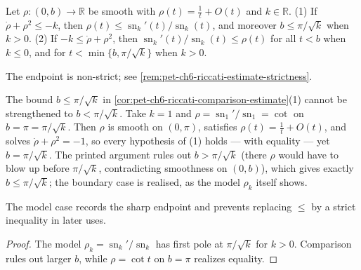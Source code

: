 \begin{corollary}
  \label{cor:pet-ch6-riccati-comparison-estimate}


  Let $\rho:(0,b)\to\mathbb{R}$ be smooth with $\rho(t)=\tfrac1t+O(t)$ and $k\in\mathbb{R}$.
  (1) If $\dot\rho+\rho^2\le-k$, then $\rho(t)\le\operatorname{sn}_k'(t)/\operatorname{sn}_k(t)$, and
  moreover $b\le\pi/\sqrt k$ when $k>0$. (2) If $-k\le\dot\rho+\rho^2$, then
  $\operatorname{sn}_k'(t)/\operatorname{sn}_k(t)\le\rho(t)$ for all $t<b$ when $k\le0$, and for
  $t<\min\{b,\pi/\sqrt k\}$ when $k>0$.

  The endpoint is non-strict; see
  \cref{rem:pet-ch6-riccati-estimate-strictness}.
\end{corollary}

\begin{remark}
  \label{rem:pet-ch6-riccati-estimate-strictness}


  The bound $b\le\pi/\sqrt k$ in \cref{cor:pet-ch6-riccati-comparison-estimate}(1)
  cannot be strengthened to $b<\pi/\sqrt k$. Take $k=1$ and
  $\rho=\operatorname{sn}_1'/\operatorname{sn}_1=\cot$ on $b=\pi=\pi/\sqrt k$. Then $\rho$ is
  smooth on $(0,\pi)$, satisfies $\rho(t)=\tfrac1t+O(t)$, and solves
  $\dot\rho+\rho^2=-1$, so every hypothesis of (1) holds — with equality — yet
  $b=\pi/\sqrt k$. The printed argument rules out $b>\pi/\sqrt k$ (there $\rho$
  would have to blow up before $\pi/\sqrt k$, contradicting smoothness on
  $(0,b)$), which gives exactly $b\le\pi/\sqrt k$; the boundary case is realised,
  as the model $\rho_k$ itself shows.

  The model case records the sharp endpoint and prevents replacing $\le$ by a
  strict inequality in later uses.
\end{remark}
\begin{proof}
  \sketch
  The model \(\rho_k=\operatorname{sn}_k'/\operatorname{sn}_k\) has first pole at \(\pi/\sqrt{k}\) for \(k>0\). Comparison rules out larger \(b\), while \(\rho=\cot t\) on \(b=\pi\) realizes equality.
\end{proof}


